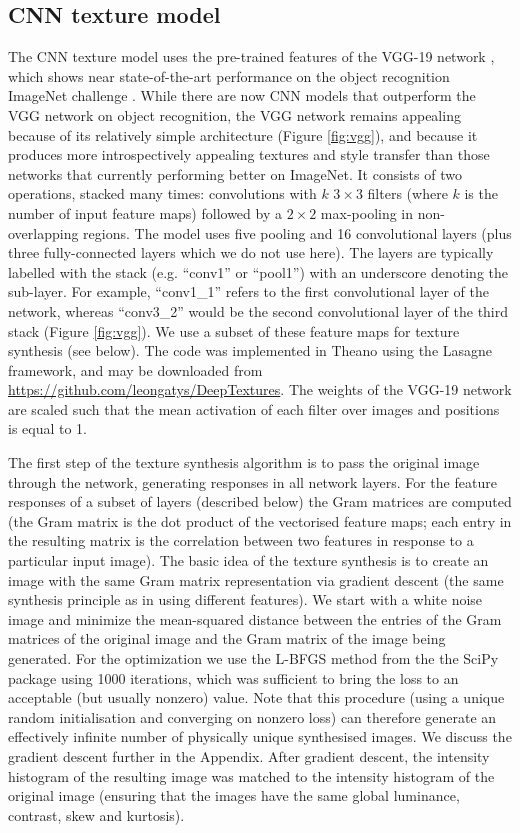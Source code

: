 \documentclass[article, 11pt,a4paper,natbib]{apa6}\usepackage[]{graphicx}\usepackage[]{color}
\begin{document}
\subsection{CNN texture model}

The CNN texture model \citep{gatys_texture_2015-1} uses the pre-trained features of the VGG-19 network \citep{simonyan_very_2015}, which shows near state-of-the-art performance on the object recognition ImageNet challenge \citep{imagenet_2015}.
While there are now CNN models that outperform the VGG network on object recognition, the VGG network remains appealing because of its relatively simple architecture (Figure \ref{fig:vgg}), and because it produces more introspectively appealing textures and style transfer than those networks that currently performing better on ImageNet. 
It consists of two operations, stacked many times: convolutions with $k$ $3 \times 3$ filters (where $k$ is the number of input feature maps) followed by a $2 \times 2$ max-pooling in non-overlapping regions.
The model uses five pooling and 16 convolutional layers (plus three fully-connected layers which we do not use here). 
The layers are typically labelled with the stack (e.g. ``conv1'' or ``pool1'') with an underscore denoting the sub-layer.
For example, ``conv1\_1'' refers to the first convolutional layer of the network, whereas ``conv3\_2'' would be the second convolutional layer of the third stack (Figure \ref{fig:vgg}).
We use a subset of these feature maps for texture synthesis (see below).
The code was implemented in Theano using the Lasagne framework, and may be downloaded from \url{https://github.com/leongatys/DeepTextures}.
The weights of the VGG-19 network are scaled such that the mean activation of each filter over images and positions is equal to 1.

The first step of the texture synthesis algorithm is to pass the original image through the network, generating responses in all network layers.
For the feature responses of a subset of layers (described below) the Gram matrices are computed (the Gram matrix is the dot product of the vectorised feature maps; each entry in the resulting matrix is the correlation between two features in response to a particular input image).
The basic idea of the texture synthesis is to create an image with the same Gram matrix representation via gradient descent (the same synthesis principle as in \citet{portilla_parametric_2000} using different features).
We start with a white noise image and minimize the mean-squared distance between the entries of the Gram matrices of the original image and the Gram matrix of the image being generated.
For the optimization we use the L-BFGS method from the the SciPy package \citep{jones_scipy_2001} using 1000 iterations, which was sufficient to bring the loss to an acceptable (but usually nonzero) value.
Note that this procedure (using a unique random initialisation and converging on nonzero loss) can therefore generate an effectively infinite number of physically unique synthesised images.
We discuss the gradient descent further in the Appendix.
After gradient descent, the intensity histogram of the resulting image was matched to the intensity histogram of the original image (ensuring that the images have the same global luminance, contrast, skew and kurtosis).
\end{document}
